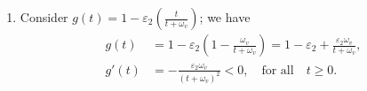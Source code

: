 \documentclass[12pt]{amsart}
\theoremstyle{definition}
\begin{document}
\begin{enumerate}
\begin{equation}
\begin{aligned}
        &=\max_{x\ge 0}\min_{1\le i\le p}\left[(1-\varepsilon_2)+
        \varepsilon_2f(\bm{\chi}_i)\right]\frac{(A_px)_i}{x_i}\\
        &=\max_{x\ge 0}\min_{1\le i\le p}\left[1-\varepsilon_2\left(1-f(\bm{\chi}_i)\right)\right]\frac{(A_px)_i}{x_i}\\
        &=\max_{x\ge 0}\min_{1\le i\le p}\left[1-\varepsilon_2\frac{\bm{\chi}_i}{\omega_v+\bm{\chi}}_i\right]\frac{(A_px)_i}{x_i}
    \end{aligned}        
    \end{equation}
    \item Consider $g(t)=1-\varepsilon_2\left(\frac{t}{t+\omega_v}\right)$; we have
    \begin{equation}
    \begin{aligned}
        g(t) &  = 1-\varepsilon_2\left(1-\frac{\omega_v}{t+\omega_v}\right)=1-\varepsilon_2+\frac{\varepsilon_2\omega_v}{t+\omega_v}, \\
        g'(t) & =-\frac{\varepsilon_2\omega_v}{(t+\omega_v)^2}<0, \quad\mbox{for all}\quad t\ge 0.
        \end{aligned}
    \end{equation}

\end{enumerate}
\end{document}
